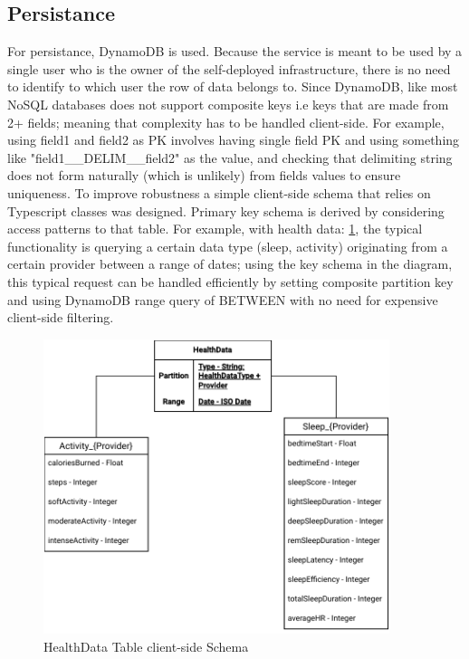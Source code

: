 \subsection{Persistance}
For persistance, DynamoDB is used. Because the service is meant to be used by a single user who is the owner of the self-deployed infrastructure, there is no need to identify to which user the row of data belongs to. Since DynamoDB, like most NoSQL databases does not support composite keys i.e keys that are made from 2+ fields; meaning that complexity has to be handled client-side. For example, using field1 and field2 as PK involves having single field PK and using something like "field1\_\_DELIM\_\_field2" as the value, and checking that delimiting string does not form naturally (which is unlikely) from fields values to ensure uniqueness. To improve robustness a simple client-side schema that relies on Typescript classes was designed. Primary key schema is derived by considering access patterns to that table. For example, with health data: \ref{fig:schema}, the typical functionality is querying a certain data type (sleep, activity) originating from a certain provider between a range of dates; using the key schema in the diagram, this typical request can be handled efficiently by setting composite partition key and using DynamoDB range query of BETWEEN with no need for expensive client-side filtering. 
\begin{figure}
    
    \centering
    \includegraphics[width=0.9\textwidth,height=\textheight,keepaspectratio]{../images/dataSchema.pdf}
    \caption{HealthData Table client-side Schema}
    \label{fig:schema}
    
\end{figure}
